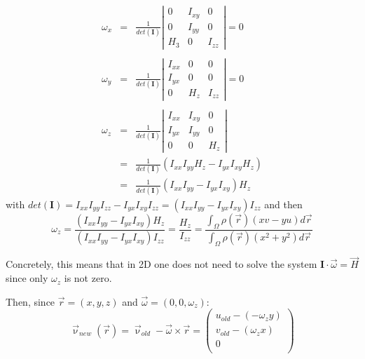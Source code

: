 \begin{eqnarray}
\omega_x
&=&
\frac{1}{det(\bm I)}
\left| 
\begin{array}{ccc}
0 & I_{xy} & 0 \\
0 & I_{yy} & 0 \\
H_3 & 0 & I_{zz} 
\end{array}
\right| = 0 \\ \nonumber\\
\omega_y
&=&
\frac{1}{det(\bm I)}
\left| 
\begin{array}{ccc}
I_{xx} & 0 & 0 \\
I_{yx} & 0 & 0 \\
0 & H_z & I_{zz} 
\end{array}
\right| = 0 \\ \nonumber\\ 
\omega_z
&=&
\frac{1}{det(\bm I)}
\left| 
\begin{array}{ccc}
I_{xx} & I_{xy} & 0\\
I_{yx} & I_{yy} & 0\\
0 & 0 & H_z
\end{array}
\right| \\
&=& \frac{1}{det(\bm I)} \left( I_{xx}I_{yy}H_z - I_{yx}I_{xy}H_z \right) \\
&=& \frac{1}{det(\bm I)} \left( I_{xx}I_{yy} - I_{yx}I_{xy} \right) H_z 
\end{eqnarray}
with $det(\bm I)=I_{xx}I_{yy}I_{zz}-I_{yx}I_{xy}I_{zz}=(I_{xx}I_{yy}-I_{yx}I_{xy})I_{zz}$ and then
\[
\omega_z
=\frac{ ( I_{xx}I_{yy} - I_{yx}I_{xy} ) H_z}{(I_{xx}I_{yy}-I_{yx}I_{xy})I_{zz}}
=\frac{ H_z}{I_{zz}}
=\frac{ \int_\Omega \rho(\vec r) (xv-yu) d\vec r }{ \int_\Omega \rho(\vec r) (x^2+y^2) d\vec r  }
\]

Concretely, this means that in 2D one does not need to solve the system ${\bm I}\cdot \vec \omega = \vec H$
since only $\omega_z$ is not zero.

Then, since $\vec{r}=(x,y,z)$ and $\vec{\omega}=(0,0,\omega_z)$: 
\begin{equation}
\vec \upnu_{new}(\vec{r}) = \vec \upnu_{old} - \vec \omega \times \vec r 
=\left(
\begin{array}{c}
u_{old} - (-\omega_z y) \\
v_{old} - (\omega_z x)\\
0 \\
\end{array}
\right)
\end{equation}















